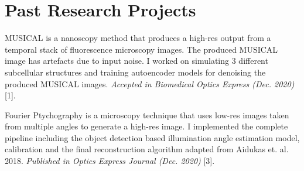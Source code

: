 \documentclass[]{deedy-resume-openfont}
\begin{document}
\begin{minipage}[t]{0.7\textwidth}



\section{Past Research Projects}

MUSICAL is a nanoscopy method that produces a high-res output from a temporal stack of fluorescence microscopy images. The produced MUSICAL image has artefacts due to input noise. I worked on simulating 3 different subcellular structures and training autoencoder models for denoising the produced MUSICAL images. \emph{Accepted in Biomedical Optics Express (Dec. 2020)} [1].
\sectionsep

Fourier Ptychography is a microscopy technique that uses low-res images taken from multiple angles to generate a high-res image. I implemented the complete pipeline including the object detection based illumination angle estimation model, calibration and the final reconstruction algorithm adapted from Aidukas et. al. 2018. \emph{Published in Optics Express Journal (Dec. 2020)} [3].
\sectionsep


\end{minipage}
\end{document}

